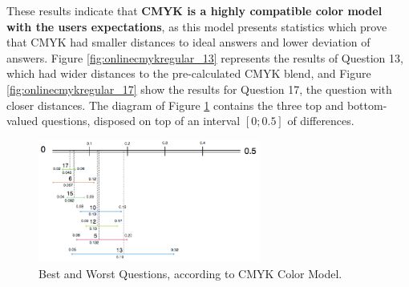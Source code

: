 %
These results indicate that \textbf{CMYK is a highly compatible color model with the users expectations}, as this model presents statistics which prove that CMYK had smaller distances to ideal answers and lower deviation of answers.
Figure \ref{fig:onlinecmykregular_13} represents the results of Question 13, which had wider distances to the pre-calculated CMYK blend, and Figure \ref{fig:onlinecmykregular_17} show the results for Question 17, the question with closer
distances. The diagram of Figure \ref{fig:cmyk_analysis} contains the three top and bottom-valued questions, disposed on top of an interval $[0 ; 0.5]$ of differences.
%
\begin{figure}[!htbp]
  \centering
  \vspace{-10pt}
  \includegraphics[width=0.65\textwidth]{images/results/cmyk_questions_analysis.png}
  \caption[Best and Worst Questions, according to CMYK Color Model.]{Best and Worst Questions, according to CMYK Color Model.}
  \vspace{-5pt}
  \label{fig:cmyk_analysis}
\end{figure}
%
%
